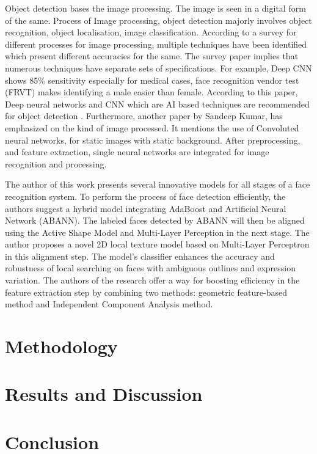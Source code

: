 \documentclass[journal]{IEEEtran}
\begin{document}
Object detection bases the image processing. The image is
seen in a digital form of the same. Process of Image
processing, object detection majorly involves object recognition,
object localisation, image classification. According to a
survey for different processes for image processing,
multiple techniques have been identified which present
different accuracies for the same. The survey paper implies
that numerous techniques have separate sets of specifications.
For example, Deep CNN shows 85\% sensitivity especially for
medical cases, face recognition vendor test (FRVT) makes
identifying a male easier than female. According to this paper,
Deep neural networks and CNN which are AI based techniques are
recommended for object detection \cite{[9]}.  Furthermore, another
paper by Sandeep Kumar, has emphasized on the kind of image
processed. It mentions the use of Convoluted neural networks,
for static images with static background. After preprocessing,
and feature extraction, single neural networks are integrated
for image recognition and processing\cite{[10]}.

The author of this work presents several innovative models for
all stages of a face recognition system. To perform the process
of face detection efficiently, the authors suggest a hybrid
model integrating AdaBoost and Artificial Neural Network (ABANN).
The labeled faces detected by ABANN will then be aligned using
the Active Shape Model and Multi-Layer Perception in the next
stage. The author proposes a novel 2D local texture model based
on Multi-Layer Perceptron in this alignment step. The model's
classifier enhances the accuracy and robustness of local
searching on faces with ambiguous outlines and expression
variation. The authors of the research offer a way for boosting
efficiency in the feature extraction step by combining two
methods: geometric feature-based method and Independent
Component Analysis method.\cite{[14]}

\section{Methodology}

\section{Results and Discussion}

\section{Conclusion}

\pagebreak



\end{document}
